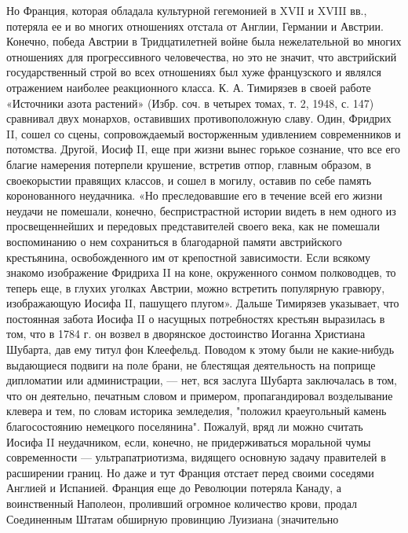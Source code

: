 Но Франция, которая обладала культурной гегемонией в XVII и XVIII вв.,
потеряла  ее  и  во  многих отношениях  отстала  от  Англии,  Германии
и  Австрии.  Конечно,  победа  Австрии  в  Тридцатилетней  войне  была
нежелательной  во многих  отношениях для  прогрессивного человечества,
но  это  не значит,  что  австрийский  государственный строй  во  всех
отношениях  был  хуже  французского   и  являлся  отражением  наиболее
реакционного класса. К.  А. Тимирязев в своей  работе «Источники азота
растений» (Избр. соч.  в четырех томах, т. 2, 1948,  с. 147) сравнивал
двух  монархов, оставивших  противоположную славу.  Один, Фридрих  II,
сошел со сцены, сопровождаемый восторженным удивлением современников и
потомства. Другой,  Иосиф II,  еще при  жизни вынес  горькое сознание,
что  все  его благие  намерения  потерпели  крушение, встретив  отпор,
главным образом,  в своекорыстии правящих  классов, и сошел  в могилу,
оставив по  себе память  коронованного неудачника.  «Но преследовавшие
его  в   течение  всей  его   жизни  неудачи  не   помешали,  конечно,
беспристрастной  истории  видеть в  нем  одного  из просвещеннейших  и
передовых  представителей своего  века, как  не помешали  воспоминанию
о  нем  сохраниться  в благодарной  памяти  австрийского  крестьянина,
освобожденного  им от  крепостной  зависимости.  Если всякому  знакомо
изображение Фридриха  II на  коне, окруженного сонмом  полководцев, то
теперь  еще,  в глухих  уголках  Австрии,  можно встретить  популярную
гравюру, изображающую  Иосифа II,  пашущего плугом».  Дальше Тимирязев
указывает,  что постоянная  забота Иосифа  II о  насущных потребностях
крестьян  выразилась в  том,  что в  1784 г.  он  возвел в  дворянское
достоинство Иоганна  Христиана Шубарта,  дав ему титул  фон Клеефельд.
Поводом к этому были не какие-нибудь выдающиеся подвиги на поле брани,
не блестящая деятельность на поприще дипломатии или администрации, ---
нет,  вся  заслуга  Шубарта  заключалась  в  том,  что  он  деятельно,
печатным  словом и  примером, пропагандировал  возделывание клевера  и
тем,  по  словам  историка земледелия,  "положил  краеугольный  камень
благосостоянию немецкого  поселянина". Пожалуй, вряд ли  можно считать
Иосифа  II неудачником,  если,  конечно,  не придерживаться  моральной
чумы  современности ---  ультрапатриотизма,  видящего основную  задачу
правителей в  расширении границ. Но  даже и тут Франция  отстает перед
своими соседями Англией и Испанией.  Франция еще до Революции потеряла
Канаду, а воинственный Наполеон,  проливший огромное количество крови,
продал  Соединенным Штатам  обширную  провинцию Луизиана  (значительно
